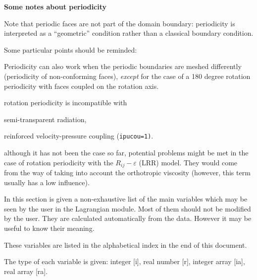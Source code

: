 {{{{\bf Some notes about periodicity}

Note that periodic faces are not part of the domain boundary:
periodicity is interpreted as a ``geometric'' condition
rather than a classical boundary condition.

Some particular points should be reminded:
\begin{list}{-}{}
\item Periodicity can also work when the periodic boundaries are meshed
      differently (periodicity of non-conforming faces), {\it except} for
      the case of a 180 degree rotation periodicity with faces coupled
      on the rotation axis.
\item rotation periodicity is incompatible with
  \begin{list}{-}{}
  \item semi-transparent radiation,
  \item reinforced velocity-pressure coupling (\texttt{ipucou=1)}.
  \end{list}
\item although it has not been the case so far, potential problems might be met
      in the case of rotation periodicity with the $R_{ij}-\varepsilon$ (LRR)
      model. They would come from the way of taking into account the
      orthotropic viscosity (however, this term usually has a low influence).
\end{list}


In this section is given a non-exhaustive list of the main variables
which may be seen by the user in the Lagrangian module. Most of them
should not be modified by the user. They are calculated automatically
from the data. However it may be useful to know their meaning.

\noindent
These variables are listed in the alphabetical index in the end of this
document.

\noindent
The type of each variable is given: integer [i], real number [r],
integer array [ia], real array [ra].



}}}
